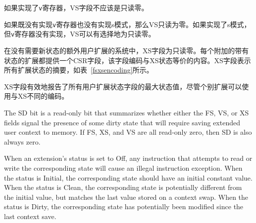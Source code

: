\iffalse
If the {\tt v} registers are implemented, the VS field shall not be
read-only zero.

If neither the {\tt v} registers nor S-mode is implemented, then VS
is read-only zero.
If S-mode is implemented but the {\tt v} registers are not, VS may
optionally be read-only zero.

In systems without additional user extensions requiring new state, the
XS field is read-only zero.  Every additional extension with state
provides a CSR field that encodes the equivalent of the XS states.
The XS field represents a summary of all
extensions' status as shown in Table~\ref{fsxsencoding}.
\fi

如果实现了{\tt v}寄存器，VS字段不应该是只读零。

如果既没有实现{\tt v}寄存器也没有实现s模式，那么VS只读为零。如果实现了s模式，但{\tt v}寄存器没有实现，VS可以有选择地为只读零。

在没有需要新状态的额外用户扩展的系统中，XS字段为只读零。每个附加的带有状态的扩展都提供一个CSR字段，该字段编码与XS状态等价的内容。XS字段表示所有扩展状态的摘要，如表~\ref{fsxsencoding}所示。

\iffalse
\begin{commentary}
The XS field effectively reports the maximum status value across all
user-extension status fields, though individual extensions can use a
different encoding than XS.
\end{commentary}
\fi

\begin{commentary}
XS字段有效地报告了所有用户扩展状态字段的最大状态值，尽管个别扩展可以使用与XS不同的编码。
\end{commentary}

\iffalse
The SD bit is a read-only bit that summarizes whether either the FS,
VS, or XS fields signal the presence of some dirty state that will
require saving extended user context to memory.  If FS, XS, and VS are all
read-only zero, then SD is also always zero.

When an extension's status is set to Off, any instruction that
attempts to read or write the corresponding state will cause an illegal instruction
exception.  When the status is Initial, the corresponding state should
have an initial constant value.  When the status is Clean, the
corresponding state is potentially different from the initial value,
but matches the last value stored on a context swap.  When the status
is Dirty, the corresponding state has potentially been modified since
the last context save.

